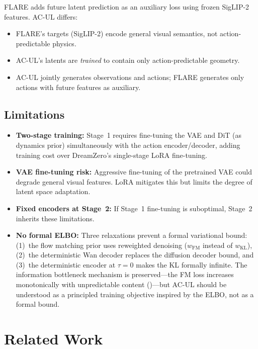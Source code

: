 \documentclass{article}
\newcommand{\KL}{\mathrm{KL}}
\begin{document}
FLARE adds future latent prediction as an auxiliary loss using frozen SigLIP-2 features. AC-UL differs:
\begin{itemize}[leftmargin=*,itemsep=2pt]
  \item FLARE's targets (SigLIP-2) encode general visual semantics, not action-predictable physics.
  \item AC-UL's latents are \emph{trained} to contain only action-predictable geometry.
  \item AC-UL jointly generates observations and actions; FLARE generates only actions with future features as auxiliary.
\end{itemize}

\subsection{Limitations}

\begin{itemize}[leftmargin=*,itemsep=2pt]
  \item \textbf{Two-stage training:} Stage~1 requires fine-tuning the VAE and DiT (as dynamics prior) simultaneously with the action encoder/decoder, adding training cost over DreamZero's single-stage LoRA fine-tuning.
  \item \textbf{VAE fine-tuning risk:} Aggressive fine-tuning of the pretrained VAE could degrade general visual features. LoRA mitigates this but limits the degree of latent space adaptation.
  \item \textbf{Fixed encoders at Stage~2:} If Stage~1 fine-tuning is suboptimal, Stage~2 inherits these limitations.
  \item \textbf{No formal ELBO:} Three relaxations prevent a formal variational bound: (1)~the flow matching prior uses reweighted denoising ($w_{\text{FM}}$ instead of $w_{\KL}$), (2)~the deterministic Wan decoder replaces the diffusion decoder bound, and (3)~the deterministic encoder at $\tau{=}0$ makes the KL formally infinite. The information bottleneck mechanism is preserved---the FM loss increases monotonically with unpredictable content ()---but AC-UL should be understood as a principled training objective inspired by the ELBO, not as a formal bound.
\end{itemize}

\section{Related Work}
\label{sec:related}
\end{document}
